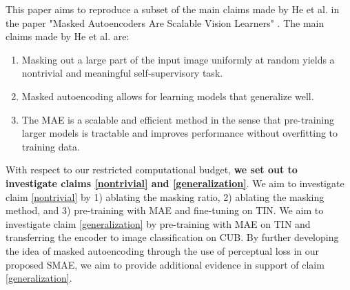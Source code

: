 This paper aims to reproduce a subset of the main claims made by He et al. in the paper "Masked Autoencoders Are Scalable Vision Learners" \cite{mae}. The main claims made by He et al. are:
\begin{enumerate}
    \item \label{nontrivial} Masking out a large part of the input image uniformly at random yields a nontrivial and meaningful self‐supervisory task. 
    \item \label{generalization} Masked autoencoding allows for learning models that generalize well.
    \item \label{scalability} The MAE is a scalable and efficient method in the sense that pre-training larger models is tractable and improves performance without overfitting to training data.
\end{enumerate}
With respect to our restricted computational budget, \textbf{we set out to investigate claims \ref{nontrivial} and \ref{generalization}}. We aim to investigate claim \ref{nontrivial} by 1) ablating the masking ratio, 2) ablating the masking method, and 3) pre-training with MAE and fine-tuning on TIN. We aim to investigate claim \ref{generalization} by pre-training with MAE on TIN and transferring the encoder to image classification on CUB. By further developing the idea of masked autoencoding through the use of perceptual loss in our proposed SMAE, we aim to provide additional evidence in support of claim \ref{generalization}.



